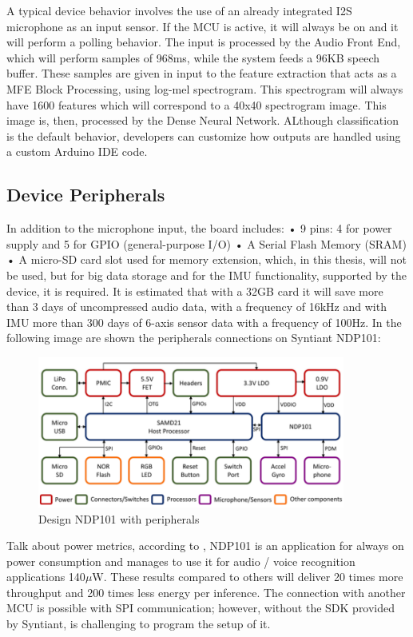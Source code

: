 \newline A typical device behavior involves the use of an already integrated I2S microphone as an input sensor. If the MCU is active, it will always be on and it will perform a polling behavior. The input is processed by the Audio Front End, which will perform samples of 968ms, while the system feeds a 96KB speech buffer. These samples are given in input to the feature extraction that acts as a MFE Block Processing\cite{syntiant_audio_block}, using log-mel spectrogram. This spectrogram will always have 1600 features which will correspond to a 40x40 spectrogram image. This image is, then, processed by the Dense Neural Network. ALthough classification is the default behavior, developers can customize how outputs are handled using a custom Arduino IDE code.
\subsection{Device Peripherals}
In addition to the microphone input, the board includes:\newline
• 9 pins: 4 for power supply and 5 for GPIO (general-purpose I/O)\newline
• A Serial Flash Memory (SRAM)\newline
• A micro-SD card slot used for memory extension, which, in this thesis, will not be used, but for big data storage and for the IMU functionality, supported by the device, it is required. It is estimated that with a 32GB card it will save more than 3 days of uncompressed audio data, with a frequency of 16kHz and with IMU more than 300 days of 6-axis sensor data with a frequency of 100Hz.\newline
In the following image are shown the peripherals connections on Syntiant NDP101:
\begin{figure}[!h]
    \centering
        \includegraphics[width=0.9\textwidth]{images/2.02 Design with peripherals.png}
        \caption{Design NDP101 with peripherals}
\end{figure}
\newline Talk about power metrics, according to \cite{analysis_syntiant_performances}, NDP101 is an application for always on power consumption and manages to use it for audio / voice recognition applications 140$\mu$W. These results compared to others will deliver 20 times more throughput and 200 times less energy per inference. The connection with another MCU is possible with SPI communication; however, without the SDK provided by Syntiant, is challenging to program the setup of it.
